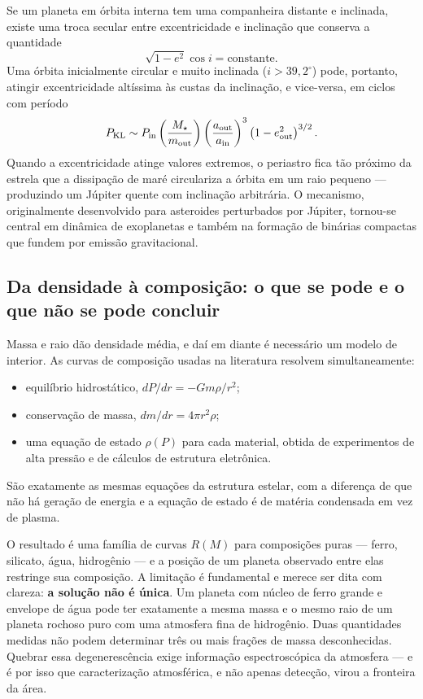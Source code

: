 \documentclass[11pt,a4paper]{article}
\begin{document}
Se um planeta em órbita interna tem uma companheira distante e inclinada, existe uma troca secular entre excentricidade e inclinação que conserva a quantidade
\[
\sqrt{1-e^{2}}\cos i=\text{constante}.
\]
Uma órbita inicialmente circular e muito inclinada ($i>39{,}2^\circ$) pode, portanto, atingir excentricidade altíssima às custas da inclinação, e vice-versa, em ciclos com período
\[
P_{\rm KL}\sim P_{\rm in}\left(\frac{M_\star}{m_{\rm out}}\right)\left(\frac{a_{\rm out}}{a_{\rm in}}\right)^{3}\left(1-e_{\rm out}^{2}\right)^{3/2}.
\]
Quando a excentricidade atinge valores extremos, o periastro fica tão próximo da estrela que a dissipação de maré circulariza a órbita em um raio pequeno --- produzindo um Júpiter quente com inclinação arbitrária. O mecanismo, originalmente desenvolvido para asteroides perturbados por Júpiter, tornou-se central em dinâmica de exoplanetas e também na formação de binárias compactas que fundem por emissão gravitacional.

\subsection*{Da densidade à composição: o que se pode e o que não se pode concluir}

Massa e raio dão densidade média, e daí em diante é necessário um modelo de interior. As curvas de composição usadas na literatura resolvem simultaneamente:
\begin{itemize}
\item equilíbrio hidrostático, $dP/dr=-Gm\rho/r^{2}$;
\item conservação de massa, $dm/dr=4\pi r^{2}\rho$;
\item uma equação de estado $\rho(P)$ para cada material, obtida de experimentos de alta pressão e de cálculos de estrutura eletrônica.
\end{itemize}
São exatamente as mesmas equações da estrutura estelar, com a diferença de que não há geração de energia e a equação de estado é de matéria condensada em vez de plasma.

O resultado é uma família de curvas $R(M)$ para composições puras --- ferro, silicato, água, hidrogênio --- e a posição de um planeta observado entre elas restringe sua composição. A limitação é fundamental e merece ser dita com clareza: \textbf{a solução não é única}. Um planeta com núcleo de ferro grande e envelope de água pode ter exatamente a mesma massa e o mesmo raio de um planeta rochoso puro com uma atmosfera fina de hidrogênio. Duas quantidades medidas não podem determinar três ou mais frações de massa desconhecidas. Quebrar essa degenerescência exige informação espectroscópica da atmosfera --- e é por isso que caracterização atmosférica, e não apenas detecção, virou a fronteira da área.
\end{document}
